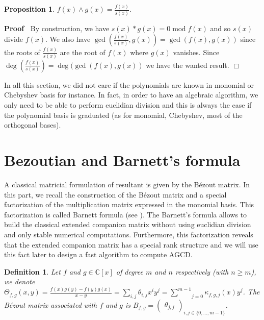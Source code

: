 \documentclass{article}
\newcommand{\tmop}[1]{\ensuremath{\operatorname{#1}}}
\newenvironment{proof}{\noindent\textbf{Proof\ }}{\hspace*{\fill}$\Box$\medskip}
\newtheorem{definition}{Definition}
\newtheorem{proposition}{Proposition}
\begin{document}
\begin{proposition}
  $f (x) \wedge g (x) = \frac{f (x)}{s (x)} .$
\end{proposition}

\begin{proof}
  By construction, we have $s (x) \ast g (x) = 0 \tmop{mod} f (x)$ and so $s
  (x)$ divide $f (x)$. We also have $\gcd ( \frac{f (x)}{s (x)}, g (x)) = \gcd
  (f (x), g (x))$ since the roots of $\frac{f (x)}{s (x)}$ are the root of $f
  (x)$ where $g (x)$ vanishes. Since $\deg ( \frac{f (x)}{s (x)}) = \deg (\gcd
  (f (x), g (x))$ we have the wanted result.
\end{proof}

In all this section, we did not care if the polynomials are known in monomial
or Chebyshev basis for instance. In fact, in order to have an algebraic
algorithm, we only need to be able to perform euclidian division and this is
always the case if the polynomial basis is graduated (as for monomial,
Chebyshev, most of the orthogonal bases).



\section{Bezoutian and Barnett's formula\label{barnett}}



A classical matricial formulation of resultant is given by the B\'ezout
matrix. In this part, we recall the construction of the B\'ezout matrix and a
special factorization of the multiplication matrix expressed in the monomial
basis. This factorization is called Barnett formula (see {\cite{B}}). The
Barnett's formula allows to build the classical extended companion matrix
without using euclidian division and only stable numerical computations.
Furthermore, this factorization reveals that the extended companion matrix has
a special rank structure and we will use this fact later to design a fast
algorithm to compute AGCD.

\begin{definition}
  Let $f$ and $g \in \mathbb{C}[x]$ of degree $m$ and $n$ respectively (with
  $n \geqslant m$), we denote $\Theta_{f, g} (x, y) = \frac{f (x) g (y) - f
  (y) g (x)}{x - y} = \underset{i, j}{\sum} \theta_{i, j} x^i y^j =
  \underset{j = 0}{\overset{m - 1}{\sum}} \kappa_{f, g, j} (x) y^j$. The
  B\'ezout matrix associated with $f$ and $g$ is $B_{f, g} =
  \left(\begin{array}{c}
    \theta_{j, j}
  \end{array}\right)_{i, j \in \{0, \ldots, m - 1\}}$.
\end{definition}
\end{document}
